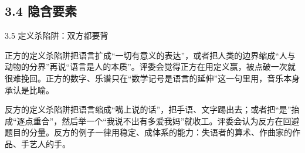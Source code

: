 \documentclass[prep,both]{debate}
\begin{document}
\subsection{3.4 隐含要素}
\begin{fields}
\end{fields}

\begin{warnbox}{3.5 定义杀陷阱：双方都要背}
\begin{fields}
\begin{procard}{正方的定义杀陷阱}把语言扩成“一切有意义的表达”，或者把人类的边界缩成“人与动物的分界”再说“语言是人的本质”。评委会觉得正方在用定义赢，被点破一次就很难挽回。正方的数字、乐谱只在“数学记号是语言的延伸”这一句里用，音乐本身承认是比喻。\end{procard}
\begin{concard}{反方的定义杀陷阱}把语言缩成“嘴上说的话”，把手语、文字踢出去；或者把“是”抬成“逐点重合”，然后举一个“我说不出有多爱我妈”就收工。评委会认为反方在回避题目的分量。反方的例子一律用稳定、成体系的能力：失语者的算术、作曲家的作品、手艺人的手。\end{concard}
\end{fields}
\end{warnbox}
\end{document}
